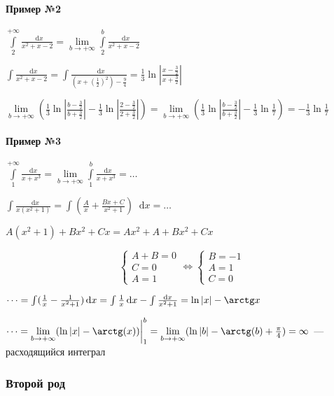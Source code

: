 \documentclass{article}
\newcommand*\diff{\mathop{}\!\mathrm{d}}
\begin{document}
\paragraph{Пример №2}

$\int\limits_{2}^{+\infty} \frac{\diff x}{x^2 + x - 2} = \lim\limits_{b \to +\infty} \int\limits_{2}^{b} \frac{\diff x}{x^2 + x - 2}$

$\int \frac{\diff x}{x^2 + x - 2} = \int \frac{\diff x}{(x + (\frac{1}{2})^2) - \frac{9}{4}} = \frac{1}{3} \ln | \frac{x - \frac{3}{2}}{x + \frac{3}{2}} |$

$
\lim\limits_{b \to +\infty} (\frac{1}{3} \ln | \frac{b - \frac{3}{2}}{b + \frac{3}{2}} | - \frac{1}{3} \ln | \frac{2 - \frac{3}{2}}{2 + \frac{3}{2}} |) = \lim\limits_{b \to +\infty} (\frac{1}{3} \ln | \frac{b - \frac{3}{2}}{b + \frac{3}{2}} | - \frac{1}{3} \ln \frac{1}{7}) = - \frac{1}{3} \ln \frac{1}{7}
$

\paragraph{Пример №3}

$\int\limits_{1}^{+\infty} \frac{\diff x}{x + x^3} = \lim\limits_{b \to +\infty} \int\limits_{1}^{b} \frac{\diff x}{x + x^3} = \dots$

$\int \frac{\diff x}{x (x^2 + 1)} = \int (\frac{A}{x} + \frac{B x + C}{x^2 + 1}) \diff x = \dots$

$A (x^2 + 1) + B x^2 + C x = A x^2 + A + Bx^2 + C x$

\begin{equation}
\begin{cases}
    A + B = 0 \\
    C = 0 \\
    A = 1
\end{cases} \Longleftrightarrow
\begin{cases}
    B = -1 \\
    A = 1 \\
    C = 0
\end{cases}
\end{equation}

$\dots = \int (\frac{1}{x} - \frac{1}{x^2 + 1}) \diff x = \int \frac{1}{x} \diff x - \int \frac{\diff x}{x^2 + 1} = \ln |x| - \arctg x$

$\dots = \lim\limits_{b \to +\infty} (\ln |x| - \arctg (x)) \bigg|_{1}^{b} = \lim\limits_{b \to +\infty} (\ln |b| - \arctg (b) + \frac{\pi}{4}) = \infty$ — расходящийся интеграл

\subsubsection{Второй род}
\end{document}
